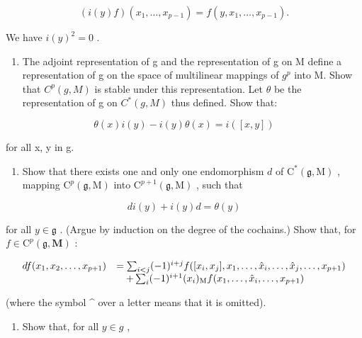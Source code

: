 \[
(i (y) f) \left(x _ {1}, \dots , x _ {p - 1}\right) = f \left(y, x _ {1}, \dots , x _ {p - 1}\right).\tag{1}
\]

We have \(i(y)^{2}=0\) .

\begin{enumerate}
\def\labelenumi{(\alph{enumi})}
\tightlist
\item
  The adjoint representation of g and the representation of g on M define a representation of g on the space of multilinear mappings of \(g^{p}\) into M. Show that \(C^{p}(g, M)\) is stable under this representation. Let \(\theta\) be the representation of g on \(C^{*}(g, M)\) thus defined. Show that:
\end{enumerate}

\[
\theta (x) i (y) - i (y) \theta (x) = i ([ x, y ])
\]

for all x, y in g.

\begin{enumerate}
\def\labelenumi{(\alph{enumi})}
\setcounter{enumi}{1}
\tightlist
\item
  Show that there exists one and only one endomorphism \(d\) of \(\mathrm{C}^*(\mathfrak{g},\mathrm{M})\) , mapping \(\mathrm{C}^p (\mathfrak{g},\mathrm{M})\) into \(\mathrm{C}^{p + 1}(\mathfrak{g},\mathrm{M})\) , such that
\end{enumerate}

\[
d i (y) + i (y) d = \theta (y)\tag{3}
\]

for all \(y \in \mathfrak{g}\) . (Argue by induction on the degree of the cochains.) Show that, for \(f \in \mathrm{C}^p(\mathfrak{g}, \mathbf{M})\) :

\[
\begin{array}{r l} d f (x _ {1}, x _ {2}, \dots , x _ {p + 1}) & = \sum_ {i <   j} (- 1) ^ {i + j} f ([ x _ {i}, x _ {j} ], x _ {1}, \dots , \hat {x} _ {i}, \dots , \hat {x} _ {j}, \dots , x _ {p + 1}) \\ & \quad + \sum_ {i} (- 1) ^ {i + 1} (x _ {i}) _ {\mathrm{M}} f (x _ {1}, \dots , \hat {x} _ {i}, \dots , x _ {p + 1}) \end{array}
\]

(where the symbol \^{} over a letter means that it is omitted).

\begin{enumerate}
\def\labelenumi{(\alph{enumi})}
\setcounter{enumi}{2}
\tightlist
\item
  Show that, for all \(y \in g\) ,
\end{enumerate}

